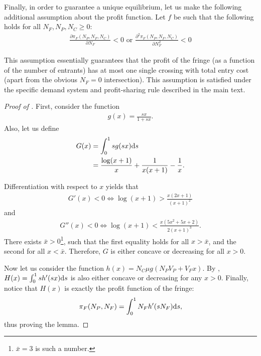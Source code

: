 \begin{assumption}Finally, in order to guarantee a unique equilibrium, let us make the following additional assumption about the profit function.
    \label{ass:single_crossing}
    Let $f$ be such that the following holds for all $N_F, N_P, N_C \geq 0$:
    \begin{align*}
        \frac{\partial \pi_F(N_P, N_F, N_C)}{\partial N_F} < 0 \text{ or } \frac{\partial^2 \pi_F(N_P, N_F, N_C)}{\partial N_F^2} < 0
    \end{align*}
\end{assumption}
This assumption essentially guarantees that the profit of the fringe (as a function of the number of entrants) has at most one single crossing with total entry cost (apart from the obvious $N_F=0$ intersection).
This assumption is satisfied under the specific demand system and profit-sharing rule described in the main text.
\begin{proof}[Proof of ]
    First, consider the function
    \begin{align*}
        g(x) = \frac{sx}{1 + sx}.
    \end{align*}
    Also, let us define
    \begin{align*}
        G(x) &= \int_0^1 s g(sx) \mathrm{d}s \\
        &= \frac{\log(x+1)}{x} + \frac{1}{x(x+1)} - \frac{1}{x}.
    \end{align*}

    Differentiation with respect to $x$ yields that
    \begin{align*}
        G'(x) < 0 \iff \log(x+1) > \frac{x (2x+1)}{(x+1)^2}
    \end{align*}
    and
    \begin{align*}
        G''(x) < 0 \iff \log(x+1) < \frac{x (5x^2 + 5x + 2)}{2 (x+1)^3}.
    \end{align*}
    There exists $\bar{x} > 0$\footnote{
        $\bar{x} = 3$ is such a number.
    }, such that the first equality holds for all $x > \bar{x}$, and the second for all $x < \bar{x}$.
    Therefore, $G$ is either concave or decreasing for all $x > 0$.

    Now let us consider the function $h(x) = N_C \mu g(N_P V_P + V_F x)$.
    By , $H(x) = \int_0^1 s h'(sx) \mathrm{d}s$ is also either concave or decreasing for any $x > 0$.
    Finally, notice that $H(x)$ is exactly the profit function of the fringe:
    \begin{align*}
        \pi_F(N_P, N_F) = \int_0^1 N_F h'(s N_F) \mathrm{d}s,
    \end{align*}
    thus proving the lemma.
\end{proof}


